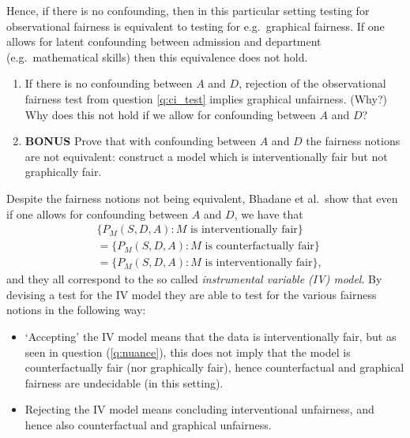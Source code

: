 \begin{enumerate}[label=14.\arabic*]
\begin{enumerate}
	\end{enumerate}
	Hence, if there is no confounding, then in this particular setting testing for observational fairness is equivalent to testing for e.g.\ graphical fairness. If one allows for latent confounding between admission and department (e.g.\ mathematical skills) then this equivalence does not hold.
	\begin{enumerate}[resume]
		\item If there is no confounding between $A$ and $D$, rejection of the observational fairness test from question \ref{q:ci_test} implies graphical unfairness. (Why?) Why does this not hold if we allow for confounding between $A$ and $D$?
		\item \label{q:nuance} \textbf{BONUS} Prove that with confounding between $A$ and $D$ the fairness notions are not equivalent: construct a model which is interventionally fair but not graphically fair.
	\end{enumerate}
	Despite the fairness notions not being equivalent, Bhadane et al.\ show that even if one allows for confounding between $A$ and $D$, we have that
	\begin{align*}
		 & \{P_M(S, D, A) : M \textrm{ is interventionally fair}\}   \\
		 & =\{P_M(S, D, A) : M \textrm{ is counterfactually fair}\}  \\
		 & =\{P_M(S, D, A) : M \textrm{ is interventionally fair}\},
	\end{align*}
	and they all correspond to the so called \emph{instrumental variable (IV) model}. By devising a test for the IV model they are able to test for the various fairness notions in the following way:
	\begin{itemize}
		\item `Accepting' the IV model means that the data is interventionally fair, but as seen in question (\ref{q:nuance}), this does not imply that the model is counterfactually fair (nor graphically fair), hence counterfactual and graphical fairness are undecidable (in this setting).
		\item Rejecting the IV model means concluding interventional unfairness, and hence also counterfactual and graphical unfairness.
	\end{itemize}


\end{enumerate}

